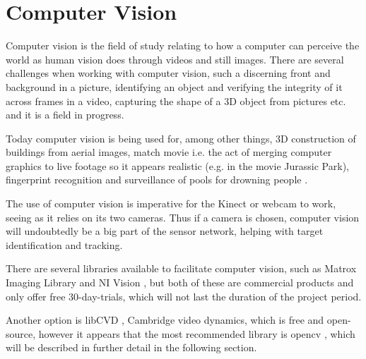 \section{Computer Vision}
Computer vision is the field of study relating to how a computer can perceive the world as human vision does through videos and still images. There are several challenges when working with computer vision, such a discerning front and background in a picture, identifying an object and verifying the integrity of it across frames in a video, capturing the shape of a 3D object from pictures etc. and it is a field in progress.

Today computer vision is being used for, among other things, 3D construction of buildings from aerial images, match movie i.e. the act of merging computer graphics to live footage so it appears realistic (e.g. in the movie Jurassic Park), fingerprint recognition and surveillance of pools for drowning people \cite{szeliski11}.

The use of computer vision is imperative for the Kinect or webcam to work, seeing as it relies on its two cameras. Thus if a camera is chosen, computer vision will undoubtedly be a big part of the sensor network, helping with target identification and tracking.

There are several libraries available to facilitate computer vision, such as Matrox Imaging Library \cite{matrox} and NI Vision \cite{nivision}, but both of these are commercial products and only offer free 30-day-trials, which will not last the duration of the project period.
 
Another option is libCVD \citep{libcvd}, Cambridge video dynamics, which is free and open-source, however it appears that the most recommended library is \ac{opencv} \cite{opencv}, which will be described in further detail in the following section.